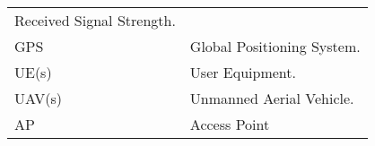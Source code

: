 \begin{longtable}[]{@{}ll@{}}
\begin{minipage}[t]{0.71\columnwidth}
Received Signal Strength.\strut
\end{minipage}\tabularnewline
\begin{minipage}[t]{0.24\columnwidth}\raggedright
GPS\strut
\end{minipage} & \begin{minipage}[t]{0.71\columnwidth}\raggedright
Global Positioning System.\strut
\end{minipage}\tabularnewline
\begin{minipage}[t]{0.24\columnwidth}\raggedright
UE(s)\strut
\end{minipage} & \begin{minipage}[t]{0.71\columnwidth}\raggedright
User Equipment.\strut
\end{minipage}\tabularnewline
\begin{minipage}[t]{0.24\columnwidth}\raggedright
UAV(s)\strut
\end{minipage} & \begin{minipage}[t]{0.71\columnwidth}\raggedright
Unmanned Aerial Vehicle.\strut
\end{minipage}\tabularnewline
\begin{minipage}[t]{0.24\columnwidth}\raggedright
AP\strut
\end{minipage} & \begin{minipage}[t]{0.71\columnwidth}\raggedright
Access Point\strut
\end{minipage}\tabularnewline
\bottomrule
\end{longtable}
